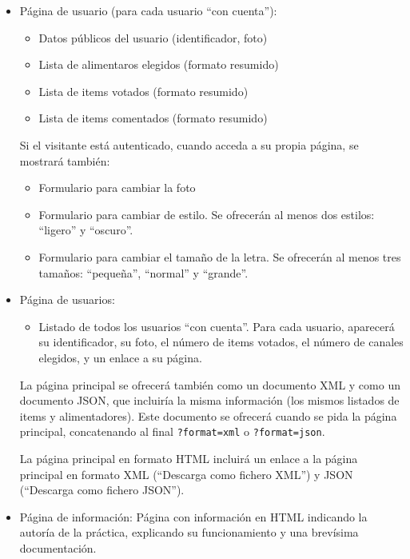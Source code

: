 \begin{itemize}
  \item Página de usuario (para cada usuario ``con cuenta''):

    \begin{itemize}
    \item Datos públicos del usuario (identificador, foto)
    \item Lista de alimentaros elegidos (formato resumido)
    \item Lista de items votados (formato resumido)
    \item Lista de items comentados (formato resumido)
    \end{itemize}

    Si el visitante está autenticado, cuando acceda a su propia página, se mostrará también:

    \begin{itemize}
    \item Formulario para cambiar la foto
    \item Formulario para cambiar de estilo. Se ofrecerán al menos dos estilos: ``ligero'' y ``oscuro''.
    \item Formulario para cambiar el tamaño de la letra. Se ofrecerán al menos tres tamaños: ``pequeña'', ``normal'' y ``grande''.
    \end{itemize}
    
  \item Página de usuarios:

    \begin{itemize}
    \item Listado de todos los usuarios ``con cuenta''. Para cada usuario, aparecerá su identificador, su foto, el número de items votados, el número de canales elegidos, y un enlace a su página.
    \end{itemize}

  La página principal se ofrecerá también como un documento XML y como un documento JSON, que incluiría la misma información (los mismos listados de items y alimentadores). Este documento se ofrecerá cuando se pida la página principal, concatenando al final \verb|?format=xml| o \verb|?format=json|.

  La página principal en formato HTML incluirá un enlace a la página principal en formato XML (``Descarga como fichero XML'') y JSON (``Descarga como fichero JSON'').  
 
  \item Página de información: Página con información en HTML indicando la autoría de la práctica, explicando su funcionamiento y una brevísima documentación.

\end{itemize}

